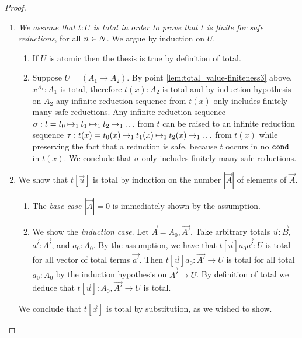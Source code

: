 \begin{proof}
\begin{enumerate}
\item
\emph{We assume that  $t:U$ is total in order to prove that $t$ is finite for safe reductions},
for all $n \in {N}$.
We argue by induction on $U$.
\begin{enumerate}
\item
If $U$ is atomic then the thesis is true by definition of total.
\item
Suppose $U = (A_1 \rightarrow A_2)$. By point \ref{lem:total_value-finiteness3} above, 
$x^{A_1}:A_1$ is total, therefore $t(x):A_2$ is total and by induction hypothesis on $A_2$
any infinite reduction sequence from $t(x)$ only includes finitely many safe reductions. 
Any infinite reduction sequence 
$\sigma: t = t_0 \mathbin{\mapsto}_1 t_1 \mathbin{\mapsto}_1 t_2 \mathbin{\mapsto}_1 \ldots$  from $t$ 
can be raised to an infinite reduction sequence 
$\tau: t(x) = t_0(x) \mathbin{\mapsto}_1 t_1(x) \mathbin{\mapsto}_1 t_2(x) \mathbin{\mapsto}_1 \ldots$ from $t(x)$
while preserving the fact that a reduction is safe, because $t$ occurs in no ${\tt cond}$ in $t(x)$.
We conclude that $\sigma$ only includes finitely many safe reductions. 
\end{enumerate}

\item  
We show that $t[\vec{u}]$ is total by induction on the number $|\vec{A}|$ of
elements of $\vec{A}$.
\begin{enumerate}
\item
  The \emph{base case} $|\vec{A}| = 0$ is immediately shown by the assumption.
\item
  We show the \emph{induction case}. Let $\vec{A} = A_0,\vec{A'}$.
  Take arbitrary totals $\vec{u}:\vec{B}$, $\vec{a'}:\vec{A'}$, and $a_0:A_0$. 
  By the assumption, we have that $t[\vec{u}]a_0\vec{a'}: U$ is total  for all 
  vector of total terms $\vec{a'}$. 
  Then $t[\vec{u}]a_0:\vec{A'}\rightarrow U$ is total for all total $a_0:A_0$
  by the induction hypothesis on $\vec{A'}\rightarrow U$.
  By definition of total we deduce that $t[\vec{u}] : A_0,\vec{A'}\rightarrow U$ is total.
\end{enumerate}
We conclude that $t[\vec{x}]$ is total by substitution, as we wished to show.

\end{enumerate}
\end{proof}



